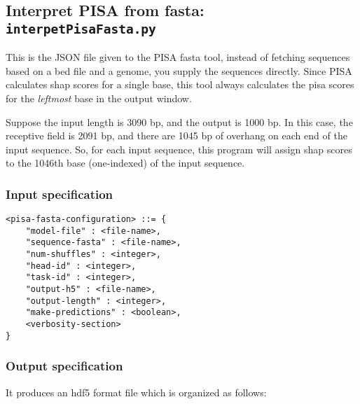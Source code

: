 \documentclass{article}
\begin{document}
\newpage

\subsection{Interpret PISA from fasta: \texttt{interpetPisaFasta.py}}

This is the JSON file given to the PISA fasta tool, instead of fetching sequences based on a bed file and a genome, you supply the sequences directly. 
Since PISA calculates shap scores for a single base, this tool always calculates the pisa scores for the \emph{leftmost} base in the output window. 

Suppose the input length is 3090 bp, and the output is 1000 bp. 
In this case, the receptive field is 2091 bp, and there are 1045 bp of overhang on each end of the input sequence.
So, for each input sequence, this program will assign shap scores to the 1046th base (one-indexed) of the input sequence. 

\subsubsection{Input specification}
\begin{lstlisting}
<pisa-fasta-configuration> ::= {
    "model-file" : <file-name>,
    "sequence-fasta" : <file-name>,
    "num-shuffles" : <integer>,
    "head-id" : <integer>,
    "task-id" : <integer>,
    "output-h5" : <file-name>,
    "output-length" : <integer>,
    "make-predictions" : <boolean>,
    <verbosity-section>
}
\end{lstlisting}

\subsubsection{Output specification}

It produces an hdf5 format file which is organized as follows:
\end{document}
